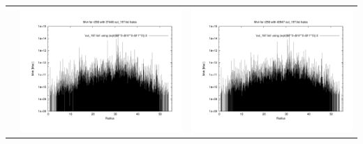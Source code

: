 \documentclass[a4paper,11pt,fleqn,oneside]{book}
\begin{document}
\begin{itemize}
\begin{table}[p]
\begin{tabular}{l|c|c}
 & \includegraphics[scale=0.25]{r256/h70/red_st14_log2/plot_mvir_out_197.pdf} & \includegraphics[scale=0.25]{r256/h100/red_st14_log2/plot_mvir_out_197.pdf} \\

\end{tabular}
\end{table}
\end{itemize}
\end{document}
